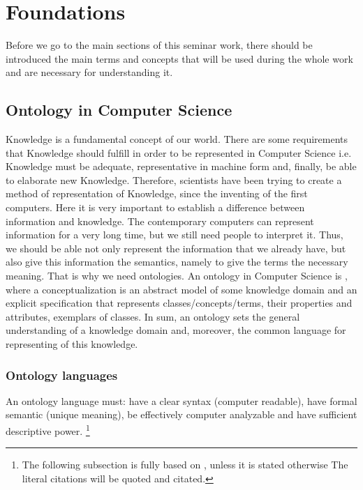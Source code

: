 \section{Foundations}
Before we go to the main sections of this seminar work, there should be introduced the main terms and concepts that will be used during the whole work and are necessary for understanding it.

	\subsection{Ontology in Computer Science}
	Knowledge is a fundamental concept of our world. There are some requirements that Knowledge should fulfill in order to be represented in Computer Science i.e. Knowledge must be adequate, representative in machine form and, finally, be able to elaborate new Knowledge. Therefore, scientists have been trying to create a method of representation of Knowledge, since the inventing of the first computers. Here it is very important to establish a difference between information and knowledge. The contemporary computers can represent information for a very long time, but we still need people to interpret it. Thus, we should be able not only represent the information that we already have, but also give this information the semantics, namely to give the terms the necessary meaning. That is why we need ontologies. An ontology in Computer Science is \frqq\cite[p. 1]{Gru93}, where a conceptualization is an abstract model of some knowledge domain and an explicit specification that  represents classes/concepts/terms, their properties and attributes, exemplars of classes. In sum, an ontology sets the general understanding of a knowledge domain and, moreover, the common language for representing of this knowledge.     
		\subsubsection{Ontology languages}
		An ontology language must: have a clear syntax (computer readable), have formal semantic (unique meaning), be effectively computer analyzable and have sufficient descriptive power. \footnote{The following subsection is fully based on \cite{Kon10}, unless it is stated otherwise  The literal citations will be quoted and citated.}
		
